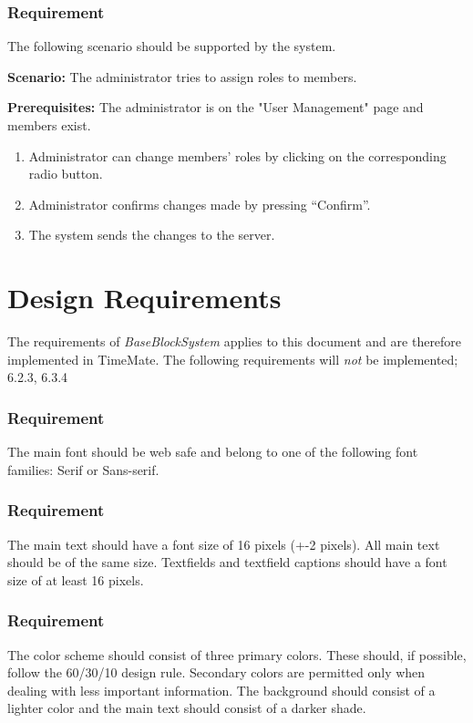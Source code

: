 \documentclass{article}
\begin{document}
\subsubsection{Requirement}
The following scenario should be supported by the system.

\textbf{Scenario:} The administrator tries to assign roles to members.

\textbf{Prerequisites:} The administrator is on the "User Management" page and members exist.

\begin{enumerate}
    \item Administrator can change members' roles by clicking on the corresponding radio button.
    \item Administrator confirms changes made by pressing “Confirm”.
    \item The system sends the changes to the server.
    
\end{enumerate}


\section{Design Requirements}
\item The requirements of \emph{BaseBlockSystem} applies to this document and are therefore implemented in TimeMate. The following requirements will \emph{not} be implemented; 6.2.3, 6.3.4

\subsubsection{Requirement}
The main font should be web safe and belong to one of the following font
families: Serif or Sans-serif.
\subsubsection{Requirement}
The main text should have a font size of 16 pixels (+-2 pixels). All main
text should be of the same size.
Textfields and textfield captions should have a font size of at least 16
pixels.
\subsubsection{Requirement}
The color scheme should consist of three primary colors. These should, if
possible, follow the 60/30/10 design rule. Secondary colors are permitted
only when dealing with less important information.
The background should consist of a lighter color and the main text should
consist of a darker shade.
\end{document}
